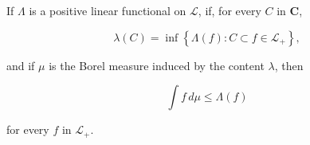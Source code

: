 If $\Lambda$ is a positive linear functional on $\mathcal{L}$, if, for every $C$ in $\mathbf{C}$,

$$\lambda(C) = \inf \left\{ \Lambda(f) : C \subset f \in \mathcal{L}_+ \right\},$$

and if $\mu$ is the Borel measure induced by the content $\lambda$, then

$$\int f \, d\mu \leq \Lambda(f)$$

for every $f$ in $\mathcal{L}_+$.

